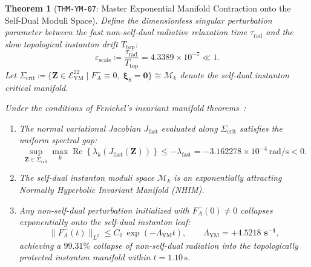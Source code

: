 \documentclass[11pt,a4paper,reqno]{article}
\theoremstyle{plain}
\newtheorem{theorem}{Theorem}[section]
\theoremstyle{definition}
\theoremstyle{remark}
\numberwithin{equation}{section}
\newcommand{\Eym}{\mathcal{E}_{\mathrm{YM}}^{22}}
\begin{document}
\begin{theorem}[\texttt{THM-YM-07}: Master Exponential Manifold Contraction onto the Self-Dual Moduli Space]
\label{thm:ym_fenichel_contraction}
Define the dimensionless singular perturbation parameter between the fast non-self-dual radiative relaxation time $\tau_{\mathrm{rad}}$ and the slow topological instanton drift $T_{\mathrm{top}}$:
\begin{equation}
  \varepsilon_{\mathrm{scale}} \coloneqq \frac{\tau_{\mathrm{rad}}}{T_{\mathrm{top}}} = 4.3389 \times 10^{-7} \ll 1.
\end{equation}
Let $\Sigma_{\mathrm{crit}} \coloneqq \{ \bm{Z} \in \Eym \mid F_A^- \equiv 0, \; \bm{\xi}_8 = \mathbf{0} \} \cong \mathcal{M}_k$ denote the self-dual instanton critical manifold. 

Under the conditions of Fenichel's invariant manifold theorems~\cite{fenichel1979}:
\begin{enumerate}[label=(\roman*),leftmargin=2.0em]
  \item The normal variational Jacobian $J_{\mathrm{fast}}$ evaluated along $\Sigma_{\mathrm{crit}}$ satisfies the uniform spectral gap:
  \begin{equation}
    \sup_{\bm{Z} \in \Sigma_{\mathrm{crit}}} \max_{k} \operatorname{Re}\left\{ \lambda_k\left( J_{\mathrm{fast}}(\bm{Z}) \right) \right\} \le -\lambda_{\mathrm{fast}} = -3.162278 \times 10^{-4}\,\mathrm{rad/s} < 0.
  \end{equation}
  \item The self-dual instanton moduli space $\mathcal{M}_k$ is an exponentially attracting Normally Hyperbolic Invariant Manifold (NHIM).
  \item Any non-self-dual perturbation initialized with $F_A^-(0) \ne 0$ collapses exponentially onto the self-dual instanton leaf:
  \begin{equation}
    \|F_A^-(t)\|_{L^2} \le C_0 \, \exp\left( -\Lambda_{\mathrm{YM}} t \right), \qquad \Lambda_{\mathrm{YM}} = \mathbf{+4.5218\text{ s}^{-1}},
    \label{eq:ym_fenichel_decay}
  \end{equation}
  achieving a $99.31\%$ collapse of non-self-dual radiation into the topologically protected instanton manifold within $t = 1.10\,\mathrm{s}$.
\end{enumerate}
\end{theorem}
\end{document}

